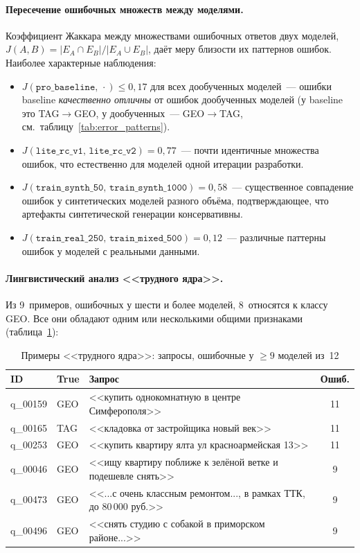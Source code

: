 \paragraph{Пересечение ошибочных множеств между моделями.} Коэффициент Жаккара между множествами ошибочных ответов двух моделей, $J(A, B) = |E_A \cap E_B| / |E_A \cup E_B|$, даёт меру близости их паттернов ошибок. Наиболее характерные наблюдения:
\begin{itemize}
    \item $J(\texttt{pro\_baseline},\,\cdot) \leqslant 0{,}17$ для всех дообученных моделей~--- ошибки baseline \emph{качественно отличны} от ошибок дообученных моделей (у baseline это TAG$\to$GEO, у дообученных~--- GEO$\to$TAG, см.~таблицу~\ref{tab:error_patterns}).
    \item $J(\texttt{lite\_rc\_v1},\,\texttt{lite\_rc\_v2}) = 0{,}77$~--- почти идентичные множества ошибок, что естественно для моделей одной итерации разработки.
    \item $J(\texttt{train\_synth\_50},\,\texttt{train\_synth\_1000}) = 0{,}58$~--- существенное совпадение ошибок у синтетических моделей разного объёма, подтверждающее, что артефакты синтетической генерации консервативны.
    \item $J(\texttt{train\_real\_250},\,\texttt{train\_mixed\_500}) = 0{,}12$~--- различные паттерны ошибок у моделей с реальными данными.
\end{itemize}

\paragraph{Лингвистический анализ <<трудного ядра>>.} Из 9~примеров, ошибочных у шести и более моделей, 8~относятся к классу GEO. Все они обладают одним или несколькими общими признаками (таблица~\ref{tab:hard_examples}):

\begin{table}[H]
\centering
\caption{Примеры <<трудного ядра>>: запросы, ошибочные у $\geqslant 9$ моделей из~12}
\label{tab:hard_examples}
\def\arraystretch{1.15}
\setlength\tabcolsep{0.3em}
{\small
\begin{tabular}{l l p{} c}
    \toprule
    \textbf{ID} & \textbf{True} & \textbf{Запрос} & \textbf{Ошиб.} \\
    \midrule
    q\_00159 & GEO & <<купить однокомнатную в центре Симферополя>>                    & 11 \\
    q\_00165 & TAG & <<кладовка от застройщика новый век>>                            & 11 \\
    q\_00253 & GEO & <<купить квартиру ялта ул красноармейская 13>>                   & 11 \\
    q\_00046 & GEO & <<ищу квартиру поближе к зелёной ветке и подешевле снять>>       &  9 \\
    q\_00473 & GEO & <<...с очень классным ремонтом..., в рамках ТТК, до 80\,000 руб.>> &  9 \\
    q\_00496 & GEO & <<снять студию с собакой в приморском районе...>>                 &  9 \\
    \bottomrule
\end{tabular}
}
\end{table}

